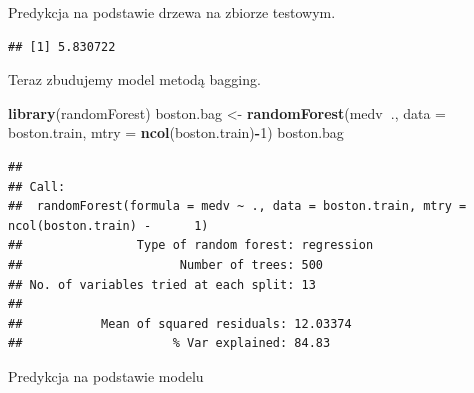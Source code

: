\documentclass[
]{book}
\newenvironment{Shaded}{\begin{snugshade}}{\end{snugshade}}
\newcommand{\ControlFlowTok}[1]{\textcolor[rgb]{0.13,0.29,0.53}{\textbf{#1}}}
\newcommand{\DataTypeTok}[1]{\textcolor[rgb]{0.13,0.29,0.53}{#1}}
\newcommand{\DecValTok}[1]{\textcolor[rgb]{0.00,0.00,0.81}{#1}}
\newcommand{\KeywordTok}[1]{\textcolor[rgb]{0.13,0.29,0.53}{\textbf{#1}}}
\newcommand{\NormalTok}[1]{#1}
\newcommand{\OperatorTok}[1]{\textcolor[rgb]{0.81,0.36,0.00}{\textbf{#1}}}
\newcommand{\StringTok}[1]{\textcolor[rgb]{0.31,0.60,0.02}{#1}}
\theoremstyle{plain}
\theoremstyle{definition}
\theoremstyle{definition}
\theoremstyle{definition}
\theoremstyle{definition}
\theoremstyle{remark}
\begin{document}
Predykcja na podstawie drzewa na zbiorze testowym.

\begin{Shaded}
\end{Shaded}

\begin{verbatim}
## [1] 5.830722
\end{verbatim}

Teraz zbudujemy model metodą bagging.

\begin{Shaded}
\begin{Highlighting}[]
\KeywordTok{library}\NormalTok{(randomForest)}
\NormalTok{boston.bag <-}\StringTok{ }\KeywordTok{randomForest}\NormalTok{(medv}\OperatorTok{~}\NormalTok{., }\DataTypeTok{data =}\NormalTok{ boston.train, }
                           \DataTypeTok{mtry =} \KeywordTok{ncol}\NormalTok{(boston.train)}\OperatorTok{-}\DecValTok{1}\NormalTok{)}
\NormalTok{boston.bag}
\end{Highlighting}
\end{Shaded}

\begin{verbatim}
## 
## Call:
##  randomForest(formula = medv ~ ., data = boston.train, mtry = ncol(boston.train) -      1) 
##                Type of random forest: regression
##                      Number of trees: 500
## No. of variables tried at each split: 13
## 
##           Mean of squared residuals: 12.03374
##                     % Var explained: 84.83
\end{verbatim}

Predykcja na podstawie modelu

\begin{Shaded}
\end{Shaded}
\end{document}
